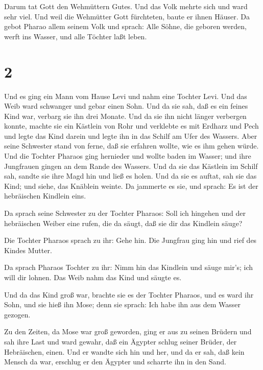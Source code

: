  Darum tat Gott den Wehmüttern Gutes. Und das Volk mehrte
sich und ward sehr viel.  Und weil die Wehmütter Gott
fürchteten, baute er ihnen Häuser.  Da gebot Pharao allem
seinem Volk und sprach: Alle Söhne, die geboren werden, werft ins
Wasser, und alle Töchter laßt leben.

\hypertarget{section-1}{%
\section{2}\label{section-1}}

 Und es ging ein Mann vom Hause Levi und nahm eine Tochter
Levi.  Und das Weib ward schwanger und gebar einen Sohn. Und
da sie sah, daß es ein feines Kind war, verbarg sie ihn drei Monate.
 Und da sie ihn nicht länger verbergen konnte, machte sie
ein Kästlein von Rohr und verklebte es mit Erdharz und Pech und legte
das Kind darein und legte ihn in das Schilf am Ufer des Wassers.
 Aber seine Schwester stand von ferne, daß sie erfahren
wollte, wie es ihm gehen würde.  Und die Tochter Pharaos
ging hernieder und wollte baden im Wasser; und ihre Jungfrauen gingen an
dem Rande des Wassers. Und da sie das Kästlein im Schilf sah, sandte sie
ihre Magd hin und ließ es holen.  Und da sie es auftat, sah
sie das Kind; und siehe, das Knäblein weinte. Da jammerte es sie, und
sprach: Es ist der hebräischen Kindlein eins.

 Da sprach seine Schwester zu der Tochter Pharaos: Soll ich
hingehen und der hebräischen Weiber eine rufen, die da säugt, daß sie
dir das Kindlein säuge?

 Die Tochter Pharaos sprach zu ihr: Gehe hin. Die Jungfrau
ging hin und rief des Kindes Mutter.

 Da sprach Pharaos Tochter zu ihr: Nimm hin das Kindlein und
säuge mir's; ich will dir lohnen. Das Weib nahm das Kind und säugte es.

 Und da das Kind groß war, brachte sie es der Tochter
Pharaos, und es ward ihr Sohn, und sie hieß ihn Mose; denn sie sprach:
Ich habe ihn aus dem Wasser gezogen.

 Zu den Zeiten, da Mose war groß geworden, ging er aus zu
seinen Brüdern und sah ihre Last und ward gewahr, daß ein Ägypter schlug
seiner Brüder, der Hebräischen, einen.  Und er wandte sich
hin und her, und da er sah, daß kein Mensch da war, erschlug er den
Ägypter und scharrte ihn in den Sand.

